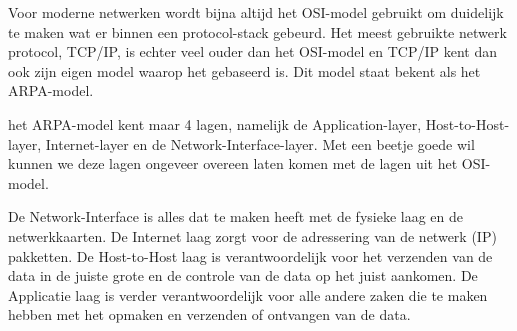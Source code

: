 Voor moderne netwerken wordt bijna altijd het OSI-model gebruikt om duidelijk te maken wat er binnen een protocol-stack gebeurd. Het meest gebruikte netwerk protocol, TCP/IP, is echter veel ouder dan het OSI-model en TCP/IP kent dan ook zijn eigen model waarop het gebaseerd is. Dit model staat bekent als het ARPA-model.

het ARPA-model kent maar 4 lagen, namelijk de Application-layer, Host-to-Host-layer, Internet-layer en de Network-Interface-layer. Met een beetje goede wil kunnen we deze lagen ongeveer overeen laten komen met de lagen uit het OSI-model.

De Network-Interface is alles dat te maken heeft met de fysieke laag en de netwerkkaarten. De Internet laag zorgt voor de adressering van de netwerk (IP) pakketten. De Host-to-Host laag is verantwoordelijk voor het verzenden van de data in de juiste grote en de controle van de data op het juist aankomen. De Applicatie laag is verder verantwoordelijk voor alle andere zaken die te maken hebben met het opmaken en verzenden of ontvangen van de data.
